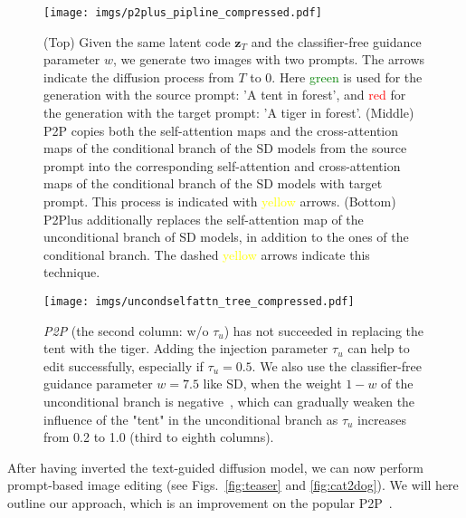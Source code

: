\documentclass[twocolumn]{svjour3}          \smartqed  \usepackage{graphicx}
\begin{document}
\begin{figure}[t]
    \centering
    \texttt{[image: imgs/p2plus\_pipline\_compressed.pdf]}
        \caption{(Top) Given the same latent code $\mathbf{z}_{T}$ and the classifier-free guidance parameter $w$, we generate two images with two prompts. The arrows indicate the diffusion process from $T$ to $0$. Here \textcolor{green}{green} is used for the generation with the source prompt: 'A tent in forest', and  \textcolor{red}{red} for the generation with the target prompt: 'A tiger in forest'. (Middle) P2P  copies both the self-attention maps and the cross-attention maps of the conditional branch of the SD models from the source prompt into the corresponding self-attention and cross-attention maps of the conditional branch of the SD models with target prompt. This process is indicated with  \textcolor{yellow}{yellow} arrows.  (Bottom) P2Plus additionally replaces the self-attention map of the unconditional branch of SD models, in addition to the ones of the conditional branch. The dashed \textcolor{yellow}{yellow} arrows indicate this technique. }
    \label{fig:p2plus_pipline}
\end{figure}



\begin{figure*}[t]
\vspace{-2mm}
   \centering
\texttt{[image: imgs/uncondselfattn\_tree\_compressed.pdf]}
       \caption{\emph{P2P} (the second column: w/o $\tau_u$) has not succeeded in replacing the tent with the tiger.
       Adding the injection parameter $\tau_u$ can help to edit successfully, especially if $\tau_u=0.5$.
       We also use the classifier-free guidance parameter $w=7.5$ like SD, when the weight $1-w$ of the unconditional branch is negative~\citep{armandpour2023re,Tumanyan_2023_CVPR}, which can gradually weaken the influence of the "tent" in the unconditional branch as $\tau_u$ increases from 0.2 to 1.0 (third to eighth columns).}
   \label{fig:uncondselfattn}
\end{figure*}


After having inverted the text-guided diffusion model, we can now perform prompt-based image editing (see Figs.~\ref{fig:teaser} and \ref{fig:cat2dog}). We will here outline our approach, which is an improvement on the popular P2P~\citep{hertz2022prompt}.
\end{document}
